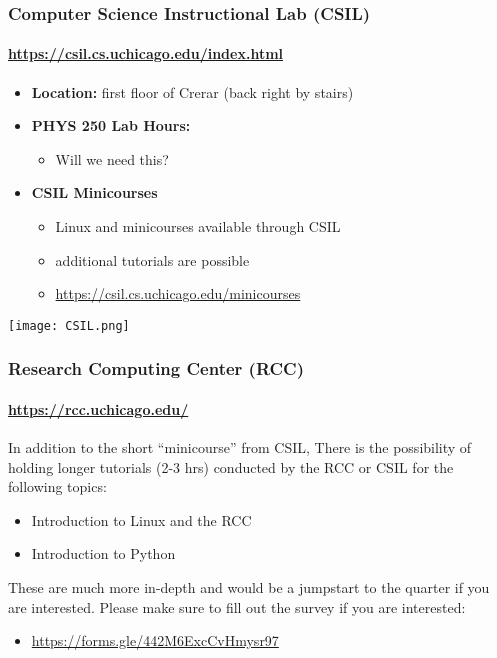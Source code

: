 \documentclass[hyperref={colorlinks=true}]{beamer}
\begin{document}
\begin{frame}%
  \frametitle{Computer Science Instructional Lab (CSIL)}
  \framesubtitle{\url{https://csil.cs.uchicago.edu/index.html}}

  \begin{itemize}
    \item \textbf{Location:} first floor of Crerar (back right by stairs)
    \item \textbf{PHYS 250 Lab Hours:}
    \begin{itemize}
      \item Will we need this?
    \end{itemize}
    \item \textbf{CSIL Minicourses}    
    \begin{itemize}
      \item Linux and \git minicourses available through CSIL
      \item additional tutorials are possible
      \item \url{https://csil.cs.uchicago.edu/minicourses}
    \end{itemize}
  \end{itemize}
    
  \centering \texttt{[image: CSIL.png]}
    
\end{frame}


\begin{frame}%
  \frametitle{Research Computing Center (RCC)}
  \framesubtitle{\url{https://rcc.uchicago.edu/}}

  In addition to the short ``minicourse'' from CSIL, There is the possibility of holding longer tutorials (2-3 hrs) conducted by the RCC or CSIL for the following topics:

  \begin{itemize}
    \item Introduction to Linux and the RCC
    \item Introduction to Python
  \end{itemize}
    
  These are much more in-depth and would be a jumpstart to the quarter if you are interested. Please make sure to fill out the survey if you are interested:
  
  \begin{itemize}
    \item \url{https://forms.gle/442M6ExcCvHmysr97}
  \end{itemize}
    
\end{frame}
\end{document}
